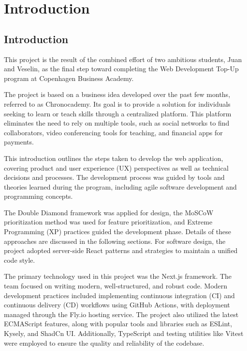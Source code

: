 \chapter{Introduction}\label{ch:introduction}

\section{Introduction}\label{sec:introduction}
This project is the result of the combined effort of two ambitious students, Juan and Veselin, as the final step toward completing the Web Development Top-Up program at Copenhagen Business Academy.

The project is based on a business idea developed over the past few months, referred to as Chronocademy.
Its goal is to provide a solution for individuals seeking to learn or teach skills through a centralized platform.
This platform eliminates the need to rely on multiple tools, such as social networks to find collaborators, video conferencing tools for teaching, and financial apps for payments.

This introduction outlines the steps taken to develop the web application, covering product and user experience (UX) perspectives as well as technical decisions and processes.
The development process was guided by tools and theories learned during the program, including agile software development and programming concepts.

The Double Diamond framework was applied for design, the MoSCoW prioritization method was used for feature prioritization, and Extreme Programming (XP) practices guided the development phase.
Details of these approaches are discussed in the following sections.
For software design, the project adopted server-side React patterns and strategies to maintain a unified code style.

The primary technology used in this project was the Next.js framework.
The team focused on writing modern, well-structured, and robust code.
Modern development practices included implementing continuous integration (CI) and continuous delivery (CD) workflows using GitHub Actions, with deployment managed through the Fly.io hosting service.
The project also utilized the latest ECMAScript features, along with popular tools and libraries such as ESLint, Kysely, and ShadCn UI. Additionally, TypeScript and testing utilities like Vitest were employed to ensure the quality and reliability of the codebase.

